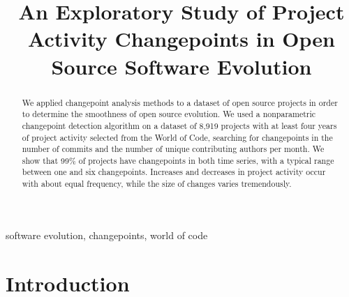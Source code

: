 \documentclass[10pt,conference]{IEEEtran}
\begin{document}
\title{An Exploratory Study of Project Activity Changepoints in Open Source Software Evolution}

\author{
\and
{}
\and
{}
}
\maketitle

\begin{abstract}
We applied changepoint analysis methods to a dataset of open source projects in order to determine the smoothness of open source evolution.
We used a nonparametric changepoint detection algorithm on a dataset of 8,919 projects with at least four years of project activity selected from the World of Code, searching for changepoints in the number of commits and the number of unique contributing authors per month.
We show that 99\% of projects have changepoints in both time series, with a typical range between one and six changepoints. Increases and decreases in project activity occur with about equal frequency, while the size of changes varies tremendously.
\end{abstract}

\begin{IEEEkeywords}
software evolution, changepoints, world of code
\end{IEEEkeywords}

\section{Introduction}
\end{document}
